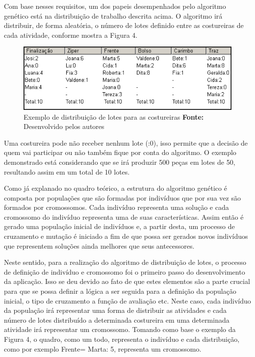 \par Com base nesses requisitos, um dos papeis desempenhados pelo algoritmo genético está na distribuição de
trabalho descrita acima. O algoritmo irá distribuir, de forma aleatória, o número de lotes definido entre as costureiras
de cada atividade, conforme mostra a Figura 4. 

\begin{figure}[h!]
	\centerline{\includegraphics[scale=1.0]{./imagens/distribuicao_exemplo.png}}
	\caption[Distribuição de trabalho]
	{Exemplo de distribuição de lotes para as costureiras \textbf{Fonte:} Desenvolvido pelos autores}
	\label{fig:exemplo1}
\end{figure}

\par Uma costureira pode não receber nenhum lote (:0), isso permite que a decisão de quem vai participar ou não também 
fique por conta do algoritmo. O exemplo demonstrado está considerando que se irá produzir 500 peças em lotes de 50, 
resultando assim em um total de 10 lotes.

\par Como já explanado no quadro teórico, a estrutura do algoritmo genético é composta
por populações que são formadas por indivíduos que por sua vez são formados por cromossomos.
Cada indivíduo representa uma solução e cada cromossomo do indivíduo representa uma de suas características. 
Assim então é gerado uma população inicial de indivíduos e, a partir desta, um processo de cruzamento 
e mutação é iniciado a fim de que possa ser gerados novos indivíduos que representem soluções ainda melhores 
que seus antecessores.

\par Neste sentido, para a realização do algoritmo de distribuição de lotes, o processo de definição de indivíduo
e cromossomo foi o primeiro passo do desenvolvimento da aplicação. Isso se deu devido ao fato de que estes elementos
são a parte crucial para que se possa definir a lógica a ser seguida para a definição da população inicial, o tipo de cruzamento 
a função de avaliação etc. Neste caso, cada indivíduo da população irá representar uma forma de distribuir as atividades e
cada número de lotes distribuído a determinada costureira em uma determinada atividade irá representar um cromossomo. Tomando como 
base o exemplo da Figura 4, o quadro, como um todo, representa o indivíduo e cada distribuição, como por exemplo Frente= Marta: 5, 
representa um cromossomo.

